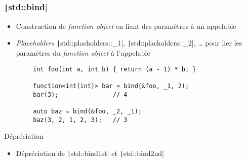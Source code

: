\documentclass[C++.tex]{subfiles}
\begin{document}
\begin{frame}[fragile]
	\frametitle{\texttt|std::bind|}
	\begin{itemize}
		\item Construction de \textit{function object} en liant des paramètres à un appelable
		\item \textit{Placeholders} \texttt|std::placholders::_1|, \texttt|std::placholders::_2|, \ldots{} pour lier les paramètres du \textit{function object} à l'appelable
	\end{itemize}

	\begin{verbatim}
		int foo(int a, int b) { return (a - 1) * b; }

		function<int(int)> bar = bind(&foo, _1, 2);
		bar(3);               // 4

		auto baz = bind(&foo, _2, _1);
		baz(3, 2, 1, 2, 3);   // 3
	\end{verbatim}


	\begin{block}{Dépréciation}
		\begin{itemize}
			\item Dépréciation de \texttt|std::bind1st| et \texttt|std::bind2nd|
		\end{itemize}

	\end{block}

\end{frame}
\end{document}
